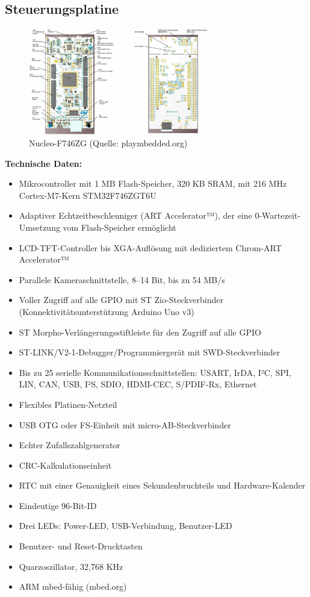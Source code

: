 \subsection{Steuerungsplatine}
\begin{figure}[!h]  %
	\centering\includegraphics[width=0.7\textwidth]{images/nucleo.jpg}
	\caption{Nucleo-F746ZG  \newline (Quelle: playmbedded.org)}
	\label{Nucleo}
\end{figure}
\textbf{Technische Daten:}
\begin{itemize} 
	\item Mikrocontroller mit 1 MB Flash-Speicher, 320 KB SRAM, mit 216 MHz Cortex-M7-Kern STM32F746ZGT6U
	\item Adaptiver Echtzeitbeschleuniger (ART Accelerator™), der eine 0-Wartezeit-Umsetzung vom Flash-Speicher ermöglicht
	\item LCD-TFT-Controller bis XGA-Auflösung mit dediziertem Chrom-ART Accelerator™
	\item Parallele Kameraschnittstelle, 8–14 Bit, bis zu 54 MB/s
	\item Voller Zugriff auf alle GPIO mit ST Zio-Steckverbinder (Konnektivitätsunterstützung Arduino Uno v3)
	\item ST Morpho-Verlängerungsstiftleiste für den Zugriff auf alle GPIO
	\item ST-LINK/V2-1-Debugger/Programmiergerät mit SWD-Steckverbinder
	\item Bis zu 25 serielle Kommunikationsschnittstellen: USART, IrDA, I²C, SPI, LIN, CAN, USB, I²S, SDIO, HDMI-CEC, S/PDIF-Rx, Ethernet
	\item Flexibles Platinen-Netzteil
	\item USB OTG oder FS-Einheit mit micro-AB-Steckverbinder
	\item Echter Zufallszahlgenerator
	\item CRC-Kalkulationseinheit
	\item RTC mit einer Genauigkeit eines Sekundenbruchteils und Hardware-Kalender
	\item Eindeutige 96-Bit-ID
	\item Drei LEDs: Power-LED, USB-Verbindung, Benutzer-LED
	\item Benutzer- und Reset-Drucktasten
	\item Quarzoszillator, 32,768 KHz
	\item ARM mbed-fähig (mbed.org)
\end{itemize}
